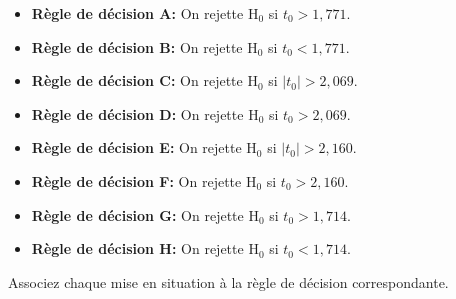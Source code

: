 \begin{questions}
\begin{itemize}
        \item {\bf Règle de décision A:} On rejette $\mathrm{H}_0$ si $t_0 > 1,771$. 
    \item {\bf Règle de décision B:} On rejette $\mathrm{H}_0$ si $t_0 < 1,771$.  

    \item {\bf Règle de décision C:}  On rejette $\mathrm{H}_0$ si $|t_0| >2,069$. 
    \item {\bf Règle de décision D:}  On rejette $\mathrm{H}_0$ si $t_0 >2,069$. 

        \item {\bf Règle de décision E:}  On rejette $\mathrm{H}_0$ si $|t_0| > 2,160$.  
    \item {\bf Règle de décision F:} On rejette $\mathrm{H}_0$ si $t_0 > 2,160$. 
    \item {\bf Règle de décision G:}  On rejette $\mathrm{H}_0$ si $t_0 > 1,714$. 
    \item {\bf Règle de décision H:}  On rejette $\mathrm{H}_0$ si $t_0 < 1,714$. 
\end{itemize}

\medskip

Associez chaque mise en situation à la règle de décision correspondante.

\medskip

\end{questions}
